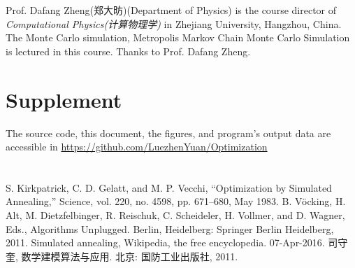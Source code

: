 \documentclass[10.5pt,a4paper]{article}
\begin{document}
Prof. Dafang Zheng(郑大昉)(Department of Physics) is the course director of \textit{Computational Physics(计算物理学)} in Zhejiang University, Hangzhou, China. The Monte Carlo simulation, Metropolis Markov Chain Monte Carlo Simulation is lectured in this course. Thanks to Prof. Dafang Zheng.


\section{Supplement}
The source code, this document, the figures, and program's output data are accessible in \url{https://github.com/LuezhenYuan/Optimization}
\section*{}
\begin{thebibliography}{ieee}
S. Kirkpatrick, C. D. Gelatt, and M. P. Vecchi, “Optimization by Simulated Annealing,” Science, vol. 220, no. 4598, pp. 671–680, May 1983.
B. Vöcking, H. Alt, M. Dietzfelbinger, R. Reischuk, C. Scheideler, H. Vollmer, and D. Wagner, Eds., Algorithms Unplugged. Berlin, Heidelberg: Springer Berlin Heidelberg, 2011.
Simulated annealing, Wikipedia, the free encyclopedia. 07-Apr-2016.
司守奎, 数学建模算法与应用. 北京: 国防工业出版社, 2011.
\end{thebibliography}
\end{document}
